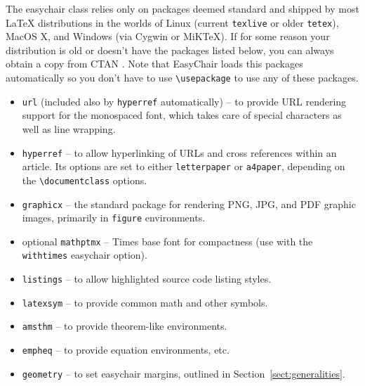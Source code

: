 \documentclass{easychair}
\newcommand{\easychair}{\textsf{easychair}}
\newcommand{\miktex}{MiK{\TeX}}
\begin{document}
The {\easychair} class relies only on packages deemed standard and shipped by
most {\LaTeX} distributions in the worlds of Linux (current \texttt{texlive} \cite{texlive}
or older \texttt{tetex}), MacOS X,
and Windows (via Cygwin or {\miktex}).
If for some reason your distribution is old or doesn't have the packages
listed below, you can always obtain a copy from CTAN \cite{ctan}. Note
that EasyChair loads this packages automatically so you don't have to
use \verb|\usepackage| to use any of these packages.

\begin{itemize}
\item
\texttt{url} \cite{url-package} (included also by \texttt{hyperref} automatically) -- to provide URL rendering support for the
monospaced font, which takes care of special characters as well as line 
wrapping.

\item
\texttt{hyperref} \cite{hyperref-package} -- to allow hyperlinking of URLs and
cross references within an article.
Its options are set to either \verb+letterpaper+ or \verb+a4paper+, depending
on the \verb+\documentclass+ options.

\item
\texttt{graphicx} \cite{graphicx-package} -- the standard package for rendering
PNG, JPG, and PDF graphic images, primarily in \texttt{figure} environments.

\item
optional \texttt{mathptmx} \cite{mathptmx-package} -- Times base font for compactness
(use with the \texttt{withtimes} {\easychair} option).

\item
\texttt{listings} \cite{listings-package} -- to allow highlighted source code 
listing styles.

\item
\texttt{latexsym} \cite{latexsym-package} -- to provide common math and other 
symbols.

\item
\texttt{amsthm} \cite{amsthm-package} -- to provide {\AmS} theorem-like 
environments.

\item
\texttt{empheq} \cite{empheq-package} -- to provide equation environments, etc.

\item
\texttt{geometry} \cite{geometry-package} -- to set {\easychair} margins, 
outlined in Section~\ref{sect:generalities}.


\end{itemize}
\end{document}
